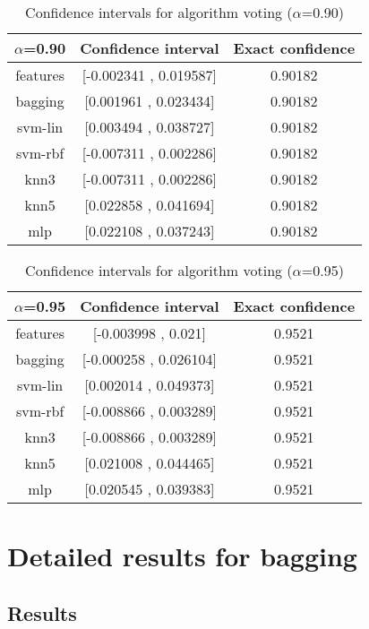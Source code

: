 \documentclass[a4paper,10pt]{article}
\begin{document}
\begin{table}[!htp]
\centering\small
\begin{tabular}{
|c|c|c|}
\hline
 $\alpha$=0.90 & Confidence interval & Exact confidence \\ \hline 
features & [-0.002341 , 0.019587] & 0.90182\\ \hline 
bagging & [0.001961 , 0.023434] & 0.90182\\ \hline 
svm-lin & [0.003494 , 0.038727] & 0.90182\\ \hline 
svm-rbf & [-0.007311 , 0.002286] & 0.90182\\ \hline 
knn3 & [-0.007311 , 0.002286] & 0.90182\\ \hline 
knn5 & [0.022858 , 0.041694] & 0.90182\\ \hline 
mlp & [0.022108 , 0.037243] & 0.90182\\ \hline 

\end{tabular}
\caption{Confidence intervals for algorithm voting ($\alpha$=0.90)}
\end{table}
\begin{table}[!htp]
\centering\small
\begin{tabular}{
|c|c|c|}
\hline
 $\alpha$=0.95 & Confidence interval & Exact confidence \\ \hline 
features & [-0.003998 , 0.021] & 0.9521\\ \hline 
bagging & [-0.000258 , 0.026104] & 0.9521\\ \hline 
svm-lin & [0.002014 , 0.049373] & 0.9521\\ \hline 
svm-rbf & [-0.008866 , 0.003289] & 0.9521\\ \hline 
knn3 & [-0.008866 , 0.003289] & 0.9521\\ \hline 
knn5 & [0.021008 , 0.044465] & 0.9521\\ \hline 
mlp & [0.020545 , 0.039383] & 0.9521\\ \hline 

\end{tabular}
\caption{Confidence intervals for algorithm voting ($\alpha$=0.95)}
\end{table}

 \clearpage 


\section{Detailed results for bagging}


\subsection{Results}
\end{document}
